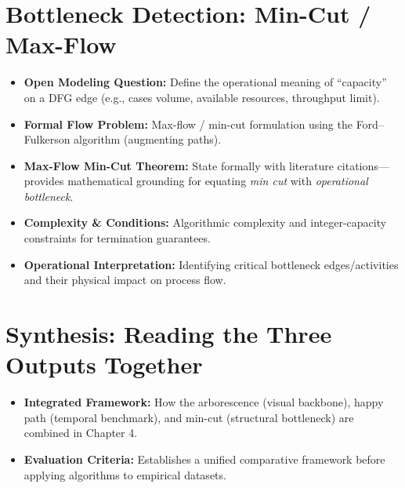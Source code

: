 \section{Bottleneck Detection: Min-Cut / Max-Flow}
\begin{itemize}[leftmargin=*]
	\item \textbf{Open Modeling Question:} Define the operational meaning of ``capacity'' on a DFG edge (e.g., cases volume, available resources, throughput limit).
	\item \textbf{Formal Flow Problem:} Max-flow / min-cut formulation using the Ford--Fulkerson algorithm (augmenting paths).
	\item \textbf{Max-Flow Min-Cut Theorem:} State formally with literature citations—provides mathematical grounding for equating \emph{min cut} with \emph{operational bottleneck}.
	\item \textbf{Complexity \& Conditions:} Algorithmic complexity and integer-capacity constraints for termination guarantees.
	\item \textbf{Operational Interpretation:} Identifying critical bottleneck edges/activities and their physical impact on process flow.
\end{itemize}

\section{Synthesis: Reading the Three Outputs Together}
\begin{itemize}[leftmargin=*]
	\item \textbf{Integrated Framework:} How the arborescence (visual backbone), happy path (temporal benchmark), and min-cut (structural bottleneck) are combined in Chapter 4.
	\item \textbf{Evaluation Criteria:} Establishes a unified comparative framework before applying algorithms to empirical datasets.
\end{itemize}